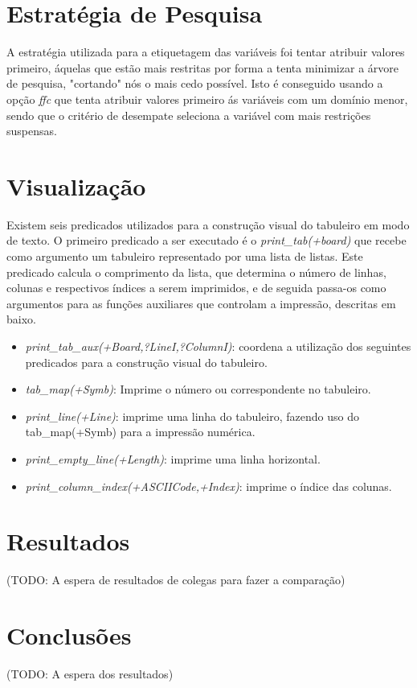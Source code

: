 \documentclass{llncs}
\begin{document}
\section{Estrat\'{e}gia de Pesquisa}

A estrat\'{e}gia utilizada para a etiquetagem das vari\'{a}veis foi tentar atribuir valores primeiro, \'{a}quelas que est\~{a}o mais restritas por forma a tenta minimizar a \'{a}rvore de pesquisa, "cortando" n\'{o}s o mais cedo poss\'{i}vel. Isto \'{e} conseguido usando a op\c{c}\~{a}o \emph{ffc} que tenta atribuir valores primeiro \'{a}s vari\'{a}veis com um dom\'{i}nio menor, sendo que o crit\'{e}rio de desempate seleciona a vari\'{a}vel com mais restri\c{c}\~{o}es suspensas.

\section{Visualiza\c{c}\~{a}o}
%
Existem seis predicados utilizados para a constru\c{c}\~{a}o visual do tabuleiro em modo de texto. O primeiro predicado a ser executado \'{e} o \textit{print\_tab(+board)} que recebe como argumento um tabuleiro representado por uma lista de listas. Este predicado calcula o comprimento da lista, que determina o n\'{u}mero de linhas, colunas e respectivos \'{i}ndices a serem imprimidos, e de seguida passa-os como argumentos  para as fun\c{c}\~{o}es auxiliares que controlam a impress\~{a}o, descritas em baixo.

\begin{itemize}
\item \textit{print\_tab\_aux(+Board,?LineI,?ColumnI)}: coordena a utiliza\c{c}\~{a}o dos seguintes predicados para a constru\c{c}\~{a}o visual do tabuleiro.
\item \textit{tab\_map(+Symb)}: Imprime o n\'{u}mero ou correspondente no tabuleiro.
\item \textit{print\_line(+Line)}: imprime uma linha do tabuleiro, fazendo uso do tab\_map(+Symb) para a impress\~{a}o num\'{e}rica.
\item \textit{print\_empty\_line(+Length)}: imprime uma linha horizontal.
\item \textit{print\_column\_index(+ASCIICode,+Index)}: imprime o \'{i}ndice das colunas.
\end{itemize}


\section{Resultados}

(TODO: A espera de resultados de colegas para fazer a compara\c{c}ão)

\section{Conclus\~{o}es}

(TODO: A espera dos resultados)
\end{document}
